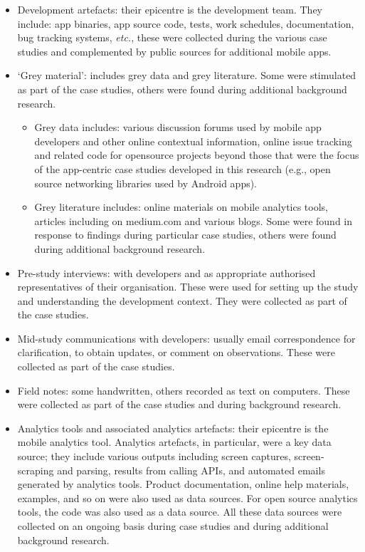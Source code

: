 \begin{itemize}
    \itemsep0em
    \item Development artefacts: their epicentre is the development team. They include: app binaries, app source code, tests, work schedules, documentation, bug tracking systems, \textit{etc.}, these were collected during the various case studies and complemented by public sources for additional mobile apps. 
    \item `Grey material': includes grey data and grey literature. Some were stimulated as part of the case studies, others were found during additional background research.
    \begin{itemize}
                \item Grey data includes: various discussion forums used by mobile app developers and other online contextual information, online issue tracking and related code for opensource projects beyond those that were the focus of the app-centric case studies developed in this research (e.g., open source networking libraries used by Android apps). 
                \item Grey literature includes: online materials on mobile analytics tools, articles including on medium.com and various blogs. Some were found in response to findings during particular case studies, others were found during additional background research.
    \end{itemize}
    \item Pre-study interviews: with developers and as appropriate authorised representatives of their organisation. These were used for setting up the study and understanding the development context. They were collected as part of the case studies.
    \item Mid-study communications with developers: usually email correspondence for clarification, to obtain updates, or comment on observations. These were collected as part of the case studies.
    \item Field notes: some handwritten, others recorded as text on computers. These were collected as part of the case studies and during background research.
    \item Analytics tools and associated analytics artefacts: their epicentre is the mobile analytics tool. Analytics artefacts, in particular, were a key data source; they include various outputs including screen captures, screen-scraping and parsing, results from calling APIs, and automated emails generated by analytics tools. Product documentation, online help materials, examples, and so on were also used as data sources. For open source analytics tools, the code was also used as a data source. All these data sources were collected on an ongoing basis during case studies and during additional background research.
\end{itemize}

